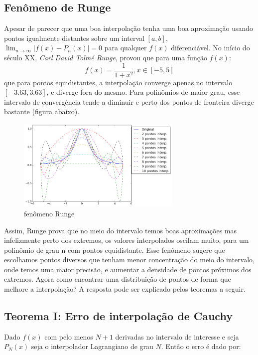 \pagebreak
\newpage

\subsection{Fenômeno de Runge}
 Apesar de parecer que uma boa interpolação tenha uma boa aproximação usando pontos igualmente distantes sobre um interval $[a,b]$, $\lim_{n \rightarrow \infty} |f(x) - P_n(x)| = 0$ para qualquer $f(x)$ diferenciável.
 No início do século XX, \emph{Carl David Tolmé Runge}, provou que para uma função $f(x)$:
 \begin{equation}
 f(x) = \frac{1}{1 + x^2} , x \in [-5,5]
 \end{equation}
 que para pontos equidistantes, a interpolação converge apenas no intervalo $[-3.63,3.63]$, e diverge fora do mesmo. Para polinômios de maior grau, esse intervalo de convergência tende a diminuir e perto dos pontos de fronteira diverge bastante (figura abaixo).

\begin{figure}[htp]
\includegraphics[width=0.7\textwidth, center]{figuras/fenomeno_runge.png}
\caption{fenômeno Runge}
\end{figure}

 Assim, Runge prova que no meio do intervalo temos boas aproximações mas infelizmente perto dos extremos, os valores interpolados oscilam muito, para um polinômio de grau n com pontos equidistante. Esse fenômeno sugere que escolhamos pontos diversos que tenham menor concentração do meio do intervalo, onde temos uma maior precisão, e aumentar a densidade de pontos próximos dos extremos.
 Agora como encontrar uma distribuição de pontos de forma que melhore a interpolação? A resposta pode ser explicado pelos teoremas a seguir.
\pagebreak
\subsection{ Teorema I: Erro de interpolação de Cauchy}

 Dado $f(x)$  com pelo menos $N+1$ derivadas no intervalo de interesse e seja $P_N(x)$ seja o interpolador Lagrangiano de grau $N$. Então o erro é dado por:
 
